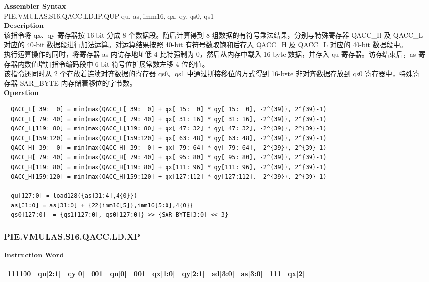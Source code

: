 \textbf{Assembler Syntax} \\
PIE.VMULAS.S16.QACC.LD.IP.QUP qu, as, imm16, qx, qy, qs0, qs1 \\
\textbf{Description} \\
该指令将 qx、qy 寄存器按 16-bit 分成 8 个数据段。随后计算得到 8 组数据的有符号乘法结果，分别与特殊寄存器 QACC\_H 及 QACC\_L 对应的 40-bit 数据段进行加法运算。对运算结果按照 40-bit 有符号数取饱和后存入 QACC\_H 及 QACC\_L 对应的 40-bit 数据段中。\\
执行运算操作的同时，将寄存器 as 内访存地址低 4 比特强制为 0，然后从内存中载入 16-byte 数据，并存入 qu 寄存器。访存结束后，as 寄存器内数值增加指令编码段中 6-bit 符号位扩展常数左移 4 位的值。\\
该指令还同时从 2 个存放着连续对齐数据的寄存器 qs0、qs1 中通过拼接移位的方式得到 16-byte 非对齐数据存放到 qs0 寄存器中，特殊寄存器 SAR\_BYTE 内存储着移位的字节数。\\
\textbf{Operation}
\begin{lstlisting}
  QACC_L[ 39:  0] = min(max(QACC_L[ 39:  0] + qx[ 15:  0] * qy[ 15:  0], -2^{39}), 2^{39}-1)
  QACC_L[ 79: 40] = min(max(QACC_L[ 79: 40] + qx[ 31: 16] * qy[ 31: 16], -2^{39}), 2^{39}-1)
  QACC_L[119: 80] = min(max(QACC_L[119: 80] + qx[ 47: 32] * qy[ 47: 32], -2^{39}), 2^{39}-1)
  QACC_L[159:120] = min(max(QACC_L[159:120] + qx[ 63: 48] * qy[ 63: 48], -2^{39}), 2^{39}-1)
  QACC_H[ 39:  0] = min(max(QACC_H[ 39:  0] + qx[ 79: 64] * qy[ 79: 64], -2^{39}), 2^{39}-1)
  QACC_H[ 79: 40] = min(max(QACC_H[ 79: 40] + qx[ 95: 80] * qy[ 95: 80], -2^{39}), 2^{39}-1)
  QACC_H[119: 80] = min(max(QACC_H[119: 80] + qx[111: 96] * qy[111: 96], -2^{39}), 2^{39}-1)
  QACC_H[159:120] = min(max(QACC_H[159:120] + qx[127:112] * qy[127:112], -2^{39}), 2^{39}-1)

  qu[127:0] = load128({as[31:4],4{0}})
  as[31:0] = as[31:0] + {22{imm16[5]},imm16[5:0],4{0}}
  qs0[127:0]  = {qs1[127:0], qs0[127:0]} >> {SAR_BYTE[3:0] << 3}
\end{lstlisting}

\newpage
\subsubsection{PIE.VMULAS.S16.QACC.LD.XP}\label{instruction:PIEVMULASS16QACCLDXP}
\setlength\tabcolsep{6pt}
\textbf{Instruction Word} \\
\begin{tabular}{|c|c|c|c|c|c|c|c|c|c|c|c|}
	\hline
	111100 & qu[2:1] & qy[0] & 001 & qu[0] & 001 & qx[1:0] & qy[2:1] & ad[3:0] & as[3:0] & 111 & qx[2] \\
	\hline
\end{tabular}

